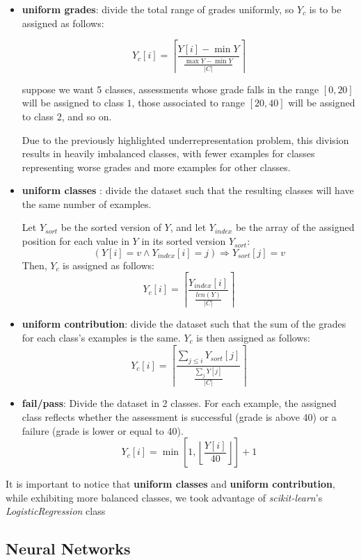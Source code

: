 \documentclass{article}
\begin{document}
\begin{itemize}
    \item \textbf{uniform grades}: divide the total range of grades uniformly, so $Y_c$ is to be assigned as follows:

    $$
Y_c[i]=\left\lceil\frac{Y[i]-\min{Y}}{\frac{\max{Y}-\min{Y}}{\lvert C\rvert}}\right\rceil
$$

suppose we want 5 classes, assessments whose grade falls in the range $[0,20]$ will be assigned to class $1$, those associated to range $[20,40]$ will be assigned to class 2, and so on. 

Due to the previously highlighted underrepresentation problem, this division results in heavily imbalanced classes, with fewer examples for classes representing worse grades and more examples for other classes.

 \item \textbf{uniform classes} : divide the dataset such that the resulting classes will have the same number of examples.

 Let $Y_{sort}$ be the sorted version of $Y$, and let $Y_{index}$ be the array of the assigned position for each value in $Y$ in its sorted version $Y_{sort}$:
$$
(Y[i]=v \land Y_{index}[i]= j ) \Rightarrow Y_{sort}[j]=v
$$
Then, $Y_c$ is assigned as follows:
$$
Y_c[i]=\left\lceil \frac{Y_{index}[i]}{\frac{len(Y)}{\lvert C \rvert}} \right\rceil
$$

\item \textbf{uniform contribution}: divide the dataset such that the sum of the grades for each class's examples is the same. $Y_c$ is then assigned as follows: $$
Y_c[i]=\left\lceil \frac{\sum\limits_{j\leq i} Y_{sort}[j]}{\frac{\sum\limits_j Y[j]}{\lvert C \rvert}} \right\rceil
$$

\item \textbf{fail/pass}: Divide the dataset in 2 classes. For each example, the assigned class reflects whether the assessment is successful (grade is above 40) or a failure (grade is lower or equal to 40).
$$
Y_c[i]= \min{[1,\left\lfloor \frac{Y[i]}{40} \right\rfloor ]} +1
$$

\end{itemize}

It is important to notice that \textbf{uniform classes} and \textbf{uniform contribution}, while exhibiting more balanced classes, 
we took advantage of \textit{scikit-learn}'s \textit{LogisticRegression} class

\subsection{Neural Networks}
\FloatBarrier
\end{document}
